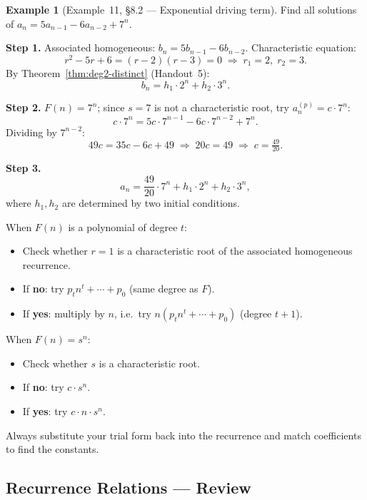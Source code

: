 \documentclass[11pt, a4paper, notitlepage]{report}
\theoremstyle{definition}
\newtheorem{example}[theorem]{Example}
\theoremstyle{remark}
\begin{document}
\begin{example}[Example~11, \S8.2 --- Exponential driving term]
\label{ex:lnhrr-ex11}
Find all solutions of $a_n = 5a_{n-1} - 6a_{n-2} + 7^n$.

\medskip\noindent\textbf{Step 1.}
Associated homogeneous: $b_n = 5b_{n-1} - 6b_{n-2}$.  Characteristic equation:
\[
  r^2 - 5r + 6 = (r-2)(r-3) = 0 \;\Rightarrow\; r_1=2,\; r_2=3.
\]
By Theorem~\ref{thm:deg2-distinct} (Handout~5):
\[
  b_n = h_1 \cdot 2^n + h_2 \cdot 3^n.
\]

\medskip\noindent\textbf{Step 2.}
$F(n) = 7^n$; since $s = 7$ is not a characteristic root, try $a_n^{(p)} = c \cdot 7^n$:
\[
  c \cdot 7^n = 5c \cdot 7^{n-1} - 6c \cdot 7^{n-2} + 7^n.
\]
Dividing by $7^{n-2}$:
\[
  49c = 35c - 6c + 49 \;\Rightarrow\; 20c = 49 \;\Rightarrow\; c = \tfrac{49}{20}.
\]

\medskip\noindent\textbf{Step 3.}
\[
  \boxed{a_n = \frac{49}{20}\cdot 7^n + h_1 \cdot 2^n + h_2 \cdot 3^n,}
\]
where $h_1, h_2$ are determined by two initial conditions.
\end{example}

\begin{examtip}[title={Exam Tip: Choosing the Right Trial Form}]
When $F(n)$ is a polynomial of degree $t$:
\begin{itemize}
  \item Check whether $r = 1$ is a characteristic root of the associated homogeneous recurrence.
  \item If \textbf{no}: try $p_t n^t + \cdots + p_0$ (same degree as $F$).
  \item If \textbf{yes}: multiply by $n$, i.e.\ try $n(p_t n^t + \cdots + p_0)$ (degree $t+1$).
\end{itemize}
When $F(n) = s^n$:
\begin{itemize}
  \item Check whether $s$ is a characteristic root.
  \item If \textbf{no}: try $c \cdot s^n$.
  \item If \textbf{yes}: try $c \cdot n \cdot s^n$.
\end{itemize}
Always substitute your trial form back into the recurrence and match coefficients to find the constants.
\end{examtip}

\subsection{Recurrence Relations --- Review}
\label{subsec:rr-review}
\end{document}
